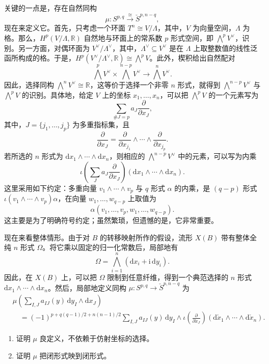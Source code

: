 关键的一点是，存在自然同构
\[
\mu\colon S^{p,q}\xrightarrow{\ \cong\ }\check S^{p,n-q},
\]
现在来定义它。首先，只考虑一个环面 $T^n\cong V/\Lambda$，其中，$V$ 为向量空间，$\Lambda$ 为格。那么，$H^p(V/\Lambda,\mathbb R)$ 自然地与环面上的常系数 $p$ 形式空间，即 $\bigwedge^pV^\vee$，识别。另一方面，对偶环面为 $V^\vee/\Lambda^\vee$，其中，$\Lambda^\vee\subseteq V^\vee$ 是在 $\Lambda$ 上取整数值的线性泛函所构成的格。于是，$H^p(V^\vee/\Lambda^\vee,\mathbb R)\cong\bigwedge^pV$。此外，楔积给出自然配对
\[
\bigwedge^pV^\vee\times\bigwedge^{n-p}V^\vee
\longrightarrow\bigwedge^nV^\vee.
\]
因此，选择同构 $\bigwedge^nV^\vee\cong\mathbb R$，这等价于选择一个非零 $n$ 形式，就得到 $\bigwedge^{n-p}V^\vee$ 与 $\bigwedge^pV$ 的识别。具体地，给定 $V$ 上的坐标 $x_1,\ldots,x_n$，可以把 $\bigwedge^pV$ 的一个元素写为
\[
\sum_{\#J=p}a_J\frac{\partial}{\partial x_J},
\]
其中，$J=\{j_1,\ldots,j_p\}$ 为多重指标集，且
\[
\frac{\partial}{\partial x_J}
=\frac{\partial}{\partial x_{j_1}}\wedge\cdots\wedge\frac{\partial}{\partial x_{j_p}}.
\]
若所选的 $n$ 形式为 $\mathrm dx_1\wedge\cdots\wedge\mathrm dx_n$，则相应的 $\bigwedge^{n-p}V^\vee$ 中的元素，可以写为内乘
\[
\iota\!\left(\sum_Ja_J\frac{\partial}{\partial x_J}\right)
(\mathrm dx_1\wedge\cdots\wedge\mathrm dx_n).
\]
这里采用如下约定：多重向量 $v_1\wedge\cdots\wedge v_p$ 与 $q$ 形式 $\alpha$ 的内乘，是 $(q-p)$ 形式 $\iota(v_1\wedge\cdots\wedge v_p)\alpha$，在向量 $w_1,\ldots,w_{q-p}$ 上取值为
\[
\alpha(v_1,\ldots,v_p,w_1,\ldots,w_{q-p}).
\]
这主要是为了明确符号约定；虽然繁琐，但遗憾的是，它非常重要。

现在来看整体情形。由于对 $B$ 的转移映射所作的假设，流形 $X(B)$ 带有整体全纯 $n$ 形式 $\Omega$。将它乘以固定的归一化常数后，局部地有
\[
\Omega=\bigwedge_{i=1}^n(\mathrm dx_i+\mathrm i\,\mathrm dy_i).
\]
因此，在 $X(B)$ 上，可以把 $\Omega$ 限制到任意纤维，得到一个典范选择的 $n$ 形式 $\mathrm dx_1\wedge\cdots\wedge\mathrm dx_n$。然后，局部地定义同构 $\mu\colon S^{p,q}\to\check S^{p,n-q}$ 为
\[
\begin{aligned}
&\mu\!\left(\sum_{I,J}a_{IJ}(y)\,\mathrm dy_I\wedge\mathrm dx_J\right)\\
&\quad=(-1)^{p+q(q-1)/2+n(n-1)/2}
\sum_{I,J}a_{IJ}(y)\,\mathrm dy_I\wedge
\iota\!\left(\frac{\partial}{\partial\check x_J}\right)
(\mathrm d\check x_1\wedge\cdots\wedge\mathrm d\check x_n).
\end{aligned}
\]

\begin{exercise}\label{exer:6.19}
\begin{enumerate}[label=(\arabic*)]
\item 证明 $\mu$ 良定义，不依赖于仿射坐标的选择。
\item 证明 $\mu$ 把闭形式映到闭形式。
\end{enumerate}
\end{exercise}

